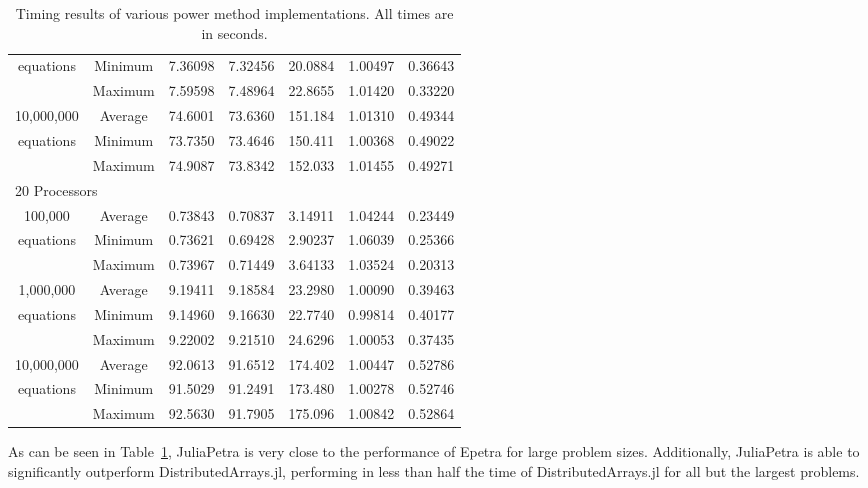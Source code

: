 \documentclass[acmsmall]{acmart}
\begin{document}
\begin{table}
\begin{tabular}{|c c|r|r|r||r|r|}
		equations		&Minimum & 7.36098 & 7.32456 & 20.0884 & 1.00497 & 0.36643 \\
						&Maximum & 7.59598 & 7.48964 & 22.8655 & 1.01420 & 0.33220 \\
	\hline
		10,000,000		&Average & 74.6001 & 73.6360 & 151.184 & 1.01310 & 0.49344 \\
		equations		&Minimum & 73.7350 & 73.4646 & 150.411 & 1.00368 & 0.49022 \\
						&Maximum & 74.9087 & 73.8342 & 152.033 & 1.01455 & 0.49271 \\
	\hline
			\multicolumn{7}{|l|}{20 Processors}\\
	\hline
		100,000			&Average & 0.73843 & 0.70837 & 3.14911 & 1.04244 & 0.23449 \\
		equations		&Minimum & 0.73621 & 0.69428 & 2.90237 & 1.06039 & 0.25366 \\
						&Maximum & 0.73967 & 0.71449 & 3.64133 & 1.03524 & 0.20313 \\
	\hline
		1,000,000		&Average & 9.19411 & 9.18584 & 23.2980 & 1.00090 & 0.39463 \\
		equations		&Minimum & 9.14960 & 9.16630 & 22.7740 & 0.99814 & 0.40177 \\
						&Maximum & 9.22002 & 9.21510 & 24.6296 & 1.00053 & 0.37435 \\
	\hline
		10,000,000		&Average & 92.0613 & 91.6512 & 174.402 & 1.00447 & 0.52786 \\
		equations		&Minimum & 91.5029 & 91.2491 & 173.480 & 1.00278 & 0.52746 \\
						&Maximum & 92.5630 & 91.7905 & 175.096 & 1.00842 & 0.52864 \\
	\hline
\end{tabular}

\caption{Timing results of various power method implementations.  All times are in seconds.}
\label{tab:timing-results}
\end{table}

As can be seen in Table~\ref{tab:timing-results}, JuliaPetra is very close to the performance
of Epetra for large problem sizes.
Additionally, JuliaPetra is able to significantly outperform DistributedArrays.jl, performing in less than
half the time of DistributedArrays.jl for all but the largest problems.
\end{document}
